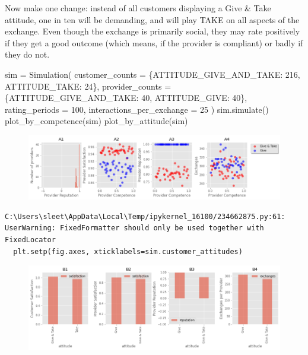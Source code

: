 \documentclass[
  letterpaper,
  DIV=11,
  numbers=noendperiod]{scrartcl}
\newenvironment{Shaded}{\begin{snugshade}}{\end{snugshade}}
\newcommand{\DecValTok}[1]{\textcolor[rgb]{0.68,0.00,0.00}{#1}}
\newcommand{\NormalTok}[1]{\textcolor[rgb]{0.00,0.23,0.31}{#1}}
\newcommand{\OperatorTok}[1]{\textcolor[rgb]{0.37,0.37,0.37}{#1}}
\begin{document}
Now make one change: instead of all customers displaying a Give \& Take
attitude, one in ten will be demanding, and will play TAKE on all
aspects of the exchange. Even though the exchange is primarily social,
they may rate positively if they get a good outcome (which means, if the
provider is compliant) or badly if they do not.

\begin{Shaded}
\begin{Highlighting}[]
\NormalTok{sim }\OperatorTok{=}\NormalTok{ Simulation(}
\NormalTok{    customer\_counts }\OperatorTok{=}\NormalTok{ \{ATTITUDE\_GIVE\_AND\_TAKE: }\DecValTok{216}\NormalTok{, ATTITUDE\_TAKE: }\DecValTok{24}\NormalTok{\},}
\NormalTok{    provider\_counts }\OperatorTok{=}\NormalTok{ \{ATTITUDE\_GIVE\_AND\_TAKE: }\DecValTok{40}\NormalTok{, ATTITUDE\_GIVE: }\DecValTok{40}\NormalTok{\},}
\NormalTok{    rating\_periods }\OperatorTok{=} \DecValTok{100}\NormalTok{,}
\NormalTok{    interactions\_per\_exchange }\OperatorTok{=} \DecValTok{25}
\NormalTok{    )}
\NormalTok{sim.simulate()}
\NormalTok{plot\_by\_competence(sim)}
\NormalTok{plot\_by\_attitude(sim)}
\end{Highlighting}
\end{Shaded}

\begin{figure}[H]

{\centering \includegraphics{provider-reputation_files/figure-pdf/cell-13-output-1.png}

}

\end{figure}

\begin{verbatim}
C:\Users\sleet\AppData\Local\Temp/ipykernel_16100/234662875.py:61: UserWarning: FixedFormatter should only be used together with FixedLocator
  plt.setp(fig.axes, xticklabels=sim.customer_attitudes)
\end{verbatim}

\begin{figure}[H]

{\centering \includegraphics{provider-reputation_files/figure-pdf/cell-13-output-3.png}

}

\end{figure}
\end{document}
